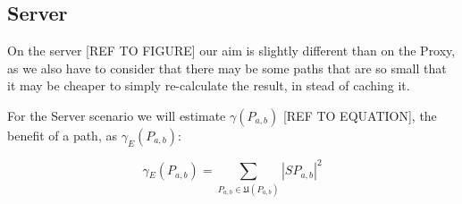\subsection{Server}\label{subsec:expServer}

On the server [REF TO FIGURE] our aim is slightly different than on the Proxy, as we also have to consider that there may be some paths that are so small that it may be cheaper to simply re-calculate the result, in stead of caching it.

For the Server scenario we will estimate 
$\gamma(P_{a,b})$ 
[REF TO EQUATION], the benefit of a path, as 
$\gamma_E(P_{a,b})$:


\begin{equation} \label{eq:estimateCost}
\gamma{_E} (P_{a,b})  =\sum\limits_{P_{a,b} \in \mathfrak{U}(P_{a,b})} |SP_{a,b}|^2
\end{equation}

% 


% 
% 
% 
% 

